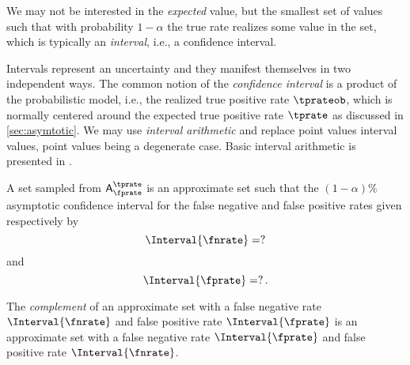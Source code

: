 \documentclass[ ../main.tex]{subfiles}
\begin{document}
We may not be interested in the \emph{expected} value, but the smallest set of values such that with probability $1-\alpha$ the true rate 
realizes some value in the set, which is typically an \emph{interval}, i.e., a confidence interval.

Intervals represent an uncertainty and they manifest themselves in two independent ways.
The common notion of the \emph{confidence interval} is a product of the probabilistic model, i.e., the realized true positive rate $\tprateob$, which is normally centered around the expected true positive rate $\tprate$ as discussed in \cref{sec:asymtotic}.
We may use \emph{interval arithmetic} and replace point values interval values, point values being a degenerate case.
Basic interval arithmetic is presented in \cite{basicinterval}.

A set sampled from $\ASet{A}[\fprate][\tprate]$ is an approximate set such that the $(1-\alpha)\%$ asymptotic confidence interval for the false negative and 
false positive rates given respectively by
\begin{equation}
\label{eq:fnrate_union_set}
\Interval{\fnrate} = ?
\end{equation}
and
\begin{equation}
\label{eq:fprate_union_set}
\Interval{\fprate} = ?\,.
\end{equation}


\begin{theorem}
\label{thm:uncertain_rates_comp_set}
The \emph{complement} of an approximate set with a false negative rate $\Interval{\fnrate}$ and false positive rate $\Interval{\fprate}$ is an approximate set with a false negative rate $\Interval{\fprate}$ and false positive rate $\Interval{\fnrate}$.
\end{theorem}
\end{document}
